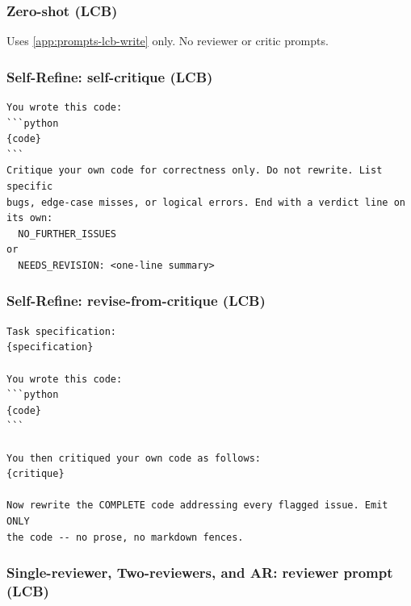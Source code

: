 \documentclass{article}
\begin{document}
\subsubsection{Zero-shot (LCB)}

Uses \autoref{app:prompts-lcb-write} only. No reviewer or critic prompts.

\subsubsection{Self-Refine: self-critique (LCB)}

\begin{footnotesize}
\begin{verbatim}
You wrote this code:
```python
{code}
```
Critique your own code for correctness only. Do not rewrite. List specific
bugs, edge-case misses, or logical errors. End with a verdict line on its own:
  NO_FURTHER_ISSUES
or
  NEEDS_REVISION: <one-line summary>
\end{verbatim}
\end{footnotesize}

\subsubsection{Self-Refine: revise-from-critique (LCB)}

\begin{footnotesize}
\begin{verbatim}
Task specification:
{specification}

You wrote this code:
```python
{code}
```

You then critiqued your own code as follows:
{critique}

Now rewrite the COMPLETE code addressing every flagged issue. Emit ONLY
the code -- no prose, no markdown fences.
\end{verbatim}
\end{footnotesize}

\subsubsection{Single-reviewer, Two-reviewers, and AR: reviewer prompt (LCB)}
\label{app:prompts-reviewer}
\end{document}
